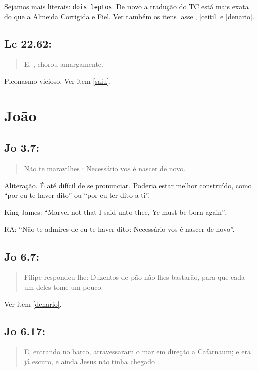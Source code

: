 Sejamos mais literais: \texttt{dois leptos}. De novo a tradução do TC está mais exata do que a Almeida Corrigida e Fiel. Ver também os itens \ref{asse}, \ref{ceitil} e \ref{denario}.


\subsection*{Lc 22.62:}
\begin{quote}
    \small
E, , chorou amargamente.
\end{quote}

Pleonasmo vicioso. Ver item \ref{saiu}.

\section{João}
\subsection*{Jo 3.7:}
\begin{quote}
    \small
Não te maravilhes : Necessário vos é nascer de novo.
\end{quote}

Aliteração. É até difícil de se pronunciar. Poderia estar melhor
construído, como ``por eu te haver dito'' ou ``por eu ter dito a ti''.

King James: ``Marvel not that I said unto thee, Ye must be born again''.

RA: ``Não te admires de eu te haver dito: Necessário vos é nascer de novo''.

\subsection*{Jo 6.7:}
\begin{quote}
    \small
Filipe respondeu-lhe: Duzentos  de pão não lhes bastarão, para que cada um deles tome um pouco.
\end{quote}

Ver item \ref{denario}.

\subsection*{Jo 6.17:}
\begin{quote}
    \small
E, entrando no barco, atravessaram o mar em direção a Cafarnaum; e era já escuro, e ainda Jesus não tinha chegado .
\end{quote}

